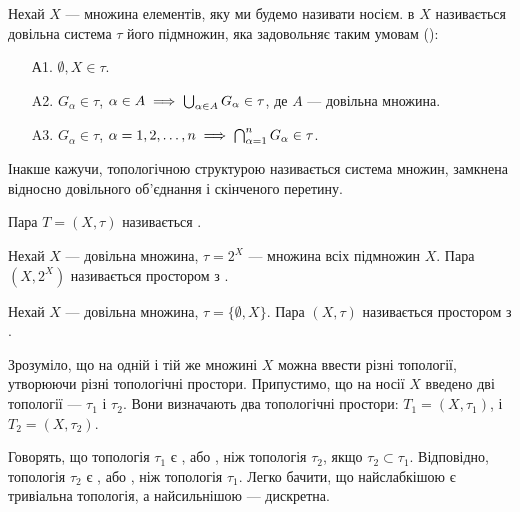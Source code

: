 \begin{definition}
Нехай $X$ --- множина елементів, яку ми будемо
називати носієм.  в $X$ називається довільна
система $\tau$ його підмножин, яка задовольняє таким умовам
():
\begin{enumerate}
\item[А1.] $\emptyset, X \in \tau$.
\item[A2.] $G_\alpha \in \tau$,
$\alpha \in A \implies \operatorname*{\bigcup}_{\alpha \in A} G_\alpha \in \tau$,
де $A$ --- довільна множина.
\item[A3.] $G_\alpha \in \tau$,
$\alpha = 1, 2, \dots, n \implies \operatorname*{\bigcap}_{\alpha = 1}^n G_\alpha \in \tau$.
\end{enumerate}
\end{definition}

Інакше кажучи, топологічною структурою називається
система множин, замкнена відносно довільного об’єднання
і скінченого перетину.

\begin{definition}
Пара $T = (X, \tau)$ називається .
\end{definition}

\begin{example}
Нехай $X$ --- довільна множина, $\tau = 2^X$ ---
множина всіх підмножин $X$. Пара $(X, 2^X)$ називається
простором з .
\end{example}

\begin{example}
Нехай $X$ --- довільна множина, $\tau = \{\emptyset, X\}$.
Пара $(X, \tau)$ називається простором з .
\end{example}

Зрозуміло, що на одній і тій же множині $X$ можна ввести
різні топології, утворюючи різні топологічні простори.
Припустимо, що на носії $X$ введено дві топології --- $\tau_1$ і $\tau_2$.
Вони визначають два топологічні простори: $T_1 = (X, \tau_1)$, і
$T_2 = (X, \tau_2)$.

Говорять, що топологія $\tau_1$ є , або ,
ніж топологія $\tau_2$, якщо $\tau_2 \subset \tau_1$. Відповідно, топологія $\tau_2$ є
, або , ніж топологія $\tau_1$. Легко бачити,
що найслабкішою є тривіальна топологія, а
найсильнішою --- дискретна.


